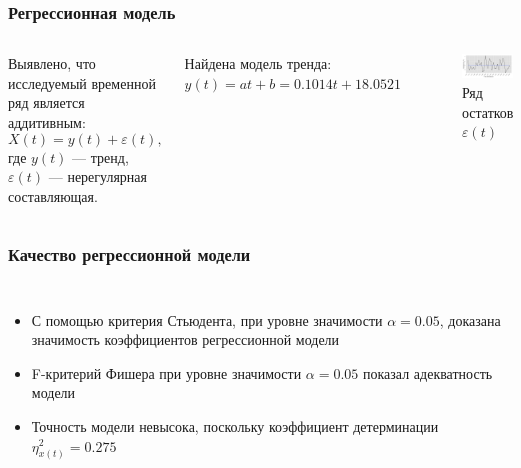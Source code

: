 \documentclass[10pt,pdf,aspectratio=169,hyperref={unicode}]{beamer}
\begin{document}
\begin{frame}
  \frametitle{Регрессионная модель}
  \begin{columns}[c]
  \column{2in}
  Выявлено, что исследуемый временной ряд является аддитивным:
  \begin{equation}
    X(t) = y(t) + \varepsilon(t),
  \end{equation}
  где $ y(t) $ --- тренд, $ \varepsilon(t) $ --- нерегулярная составляющая.

  \vspace{0.5em}

  Найдена модель тренда: $ y(t) = at + b = 0.1014t + 18.0521 $
  \column{4in}
    \begin{figure}[h]
    \includegraphics[width=1\linewidth]{../../figures/residual/time-series.png}
    \caption{Ряд остатков $ \varepsilon(t) $}
  \end{figure}
  \end{columns}
\end{frame}

\begin{frame}
  \frametitle{Качество регрессионной модели}
  \begin{columns}[c]
  \column{3in}
    \begin{itemize}
      \item С помощью критерия Стьюдента, при уровне значимости $ \alpha=0.05 $, доказана значимость коэффициентов регрессионной модели
      \item F-критерий Фишера при уровне значимости $ \alpha = 0.05 $ показал адекватность модели
      \item Точность модели невысока, поскольку коэффициент детерминации $ \eta^2_{x(t)} = 0.275 $
    \end{itemize}
  \column{3in}
    
  \end{columns}
\end{frame}
\end{document}

